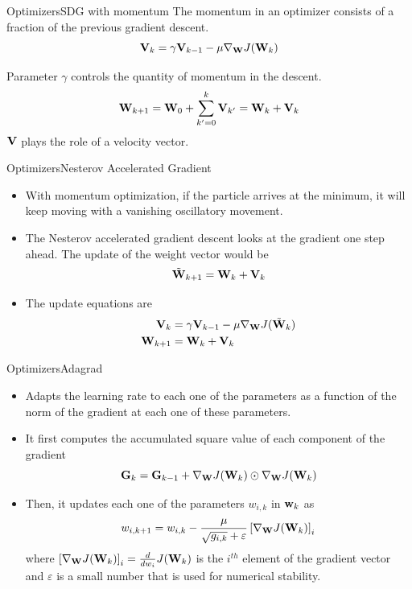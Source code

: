 \documentclass{beamer}
\begin{document}
\begin{frame}{Optimizers}{SDG with momentum}
The momentum in an optimizer consists of a fraction of the previous gradient descent. 
\begin{equation}\label{eq:momentum_velocity}
    {\bf V}_{k} = \gamma{\bf V}_{k-1} - \mu \nabla_{{\bf W}} J({\bf W}_{k}) 
\end{equation}

Parameter $\gamma$ controls the quantity of momentum in the descent. 
\begin{equation}
    {\bf W}_{k+1} = {\bf W}_0 + \sum_{k'=0}^k {\bf V}_{k'} = {\bf W}_{k} + {\bf V}_k
\end{equation}
${\bf V}$ plays the role of a velocity vector.
\end{frame}

\begin{frame}{Optimizers}{Nesterov Accelerated Gradient}
\begin{itemize}
\item With momentum optimization, if the particle arrives at the minimum, it will keep moving with a vanishing oscillatory movement. 
\item  The Nesterov accelerated gradient descent looks at the gradient one step ahead. The update of the weight vector would be 
\begin{equation}
    \tilde{{\bf W}}_{k+1} = {\bf W}_{k} + {\bf V}_k
\end{equation}
\item The update equations are 
\begin{equation}
\begin{split}
    {\bf V}_k &= \gamma {\bf V}_{k-1} - \mu \nabla_{{\bf W}} J(\tilde{{\bf W}}_k)\\
    {\bf W}_{k+1} & = {\bf W}_k + {\bf V}_k 
\end{split}
\end{equation}
\end{itemize} 
\end{frame}

\begin{frame}{Optimizers}{Adagrad}
\begin{itemize}
\item Adapts the learning rate to each one of the parameters as a function of the norm of the gradient at each one of these parameters. 
\item It first computes the accumulated square value of each component of the gradient 
\begin{equation}
    {\bf G}_k = {\bf G}_{k-1} + \nabla_{{\bf W}}J({\bf W}_{k}) \odot \nabla_{{\bf W}}J({\bf W}_{k})
\end{equation}
\item Then, it updates each one of the parameters $w_{i,k}$ in ${\bf w}_k$ as
\begin{equation}
    w_{i,k+1} = w_{i,k} - \frac{\mu}{\sqrt{g_{i,k}}+\varepsilon} \left[\nabla_{{\bf W}}J({\bf W}_{k})\right]_i
\end{equation}
where $\left[\nabla_{{\bf W}}J({\bf W}_{k})\right]_i=\frac{d}{dw_{i}}J({\bf W}_{k})$ is the $i^{th}$ element of the gradient vector and $\varepsilon$ is a small number that is used for numerical stability. 
\end{itemize}
    
\end{frame}
\end{document}
